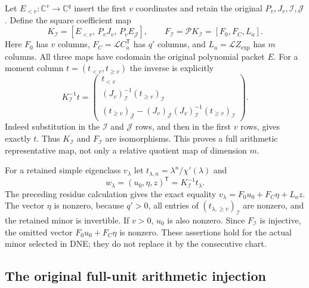 Let $E_{<v}:\mathbb C^v\to\mathbb C^q$ insert the first $v$
coordinates and retain the original $P_v,J_v,\mathcal I,\mathcal J$.
Define the square coefficient map
\[
 K_{\mathcal I}=
 [E_{<v},\,P_vJ_v,\,P_vE_{\mathcal J}],\qquad
 F_{\mathcal I}=\mathscr P K_{\mathcal I}=[F_0,F_C,L_a].
 \tag{NCRP3}
\]
Here $F_0$ has $v$ columns, $F_C=\mathcal L C_a^{\mathsf T}$
has $q'$ columns, and $L_a=\mathcal L Z_{\exp}$ has $m$ columns.
All three maps have codomain the original polynomial packet $E$.
For a moment column $t=(t_{<v},t_{\ge v})$ the inverse is explicitly
\[
 K_{\mathcal I}^{-1}t=
 \begin{pmatrix}
 t_{<v}\\
 (J_v)_{\mathcal I}^{-1}(t_{\ge v})_{\mathcal I}\\
 (t_{\ge v})_{\mathcal J}
       -(J_v)_{\mathcal J}(J_v)_{\mathcal I}^{-1}
                                (t_{\ge v})_{\mathcal I}
 \end{pmatrix}.
 \tag{NCRP4}
\]
Indeed substitution in the $\mathcal I$ and $\mathcal J$ rows,
and then in the first $v$ rows, gives exactly $t$.
Thus $K_{\mathcal I}$ and $F_{\mathcal I}$ are isomorphisms.
This proves a full arithmetic representative map, not only a
relative quotient map of dimension $m$.

For a retained simple eigenclass $v_\lambda$ let
$t_{\lambda,n}=\lambda^n/\chi'(\lambda)$ and
\[
 w_\lambda=(u_0,\eta,z)^{\mathsf T}
                  =K_{\mathcal I}^{-1}t_\lambda .
 \tag{NCRP5}
\]
The preceding residue calculation gives the exact equality
$v_\lambda=F_0u_0+F_C\eta+L_az$.
The vector $\eta$ is nonzero, because $q'>0$, all entries of
$(t_{\lambda,\ge v})_{\mathcal I}$ are nonzero, and the retained
minor is invertible. If $v>0$, $u_0$ is also nonzero.
Since $F_{\mathcal I}$ is injective, the omitted vector
$F_0u_0+F_C\eta$ is nonzero. These assertions hold for the actual
minor selected in DNE; they do not replace it by the consecutive chart.

\subsection{The original full-unit arithmetic injection}

